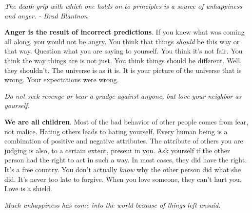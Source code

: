 \documentclass[a4paper,hidelinks]{article}
\begin{document}
\newpage

\begin{center}
\textit{
The death-grip with which one holds on to principles is a source of unhappiness and anger. - Brad Blantnon
}
\end{center}

\textbf{Anger is the result of incorrect predictions}.
If you knew what was coming all along, you would not be angry.
You think that things \textit{should} be this way or that way.
Question what you are saying to yourself.
You think it's not fair.
You think the way things are is not just.
You think things should be different.
Well, they shouldn't.
The universe is as it is.
It is your picture of the universe that is wrong.
Your expectations were wrong.

\newpage

\begin{center}
\textit{
Do not seek revenge or bear a grudge against anyone, but love your neighbor as yourself.
}
\end{center}

\textbf{We are all children}.
Most of the bad behavior of other people comes from fear, not malice.
Hating others leads to hating yourself.
Every human being is a combination of positive and negative attributes.
The attribute of others you are judging is also, to a certain extent, present in you.
Ask yourself if the other person had the right to act in such a way.
In most cases, they did have the right.
It's a free country.
You don't actually \textit{know} why the other person did what she did.
It's never too late to forgive.
When you love someone, they can't hurt you.
Love is a shield.

\newpage

\begin{center}
\textit{
Much unhappiness has come into the world because of things left unsaid.
}
\end{center}
\end{document}
